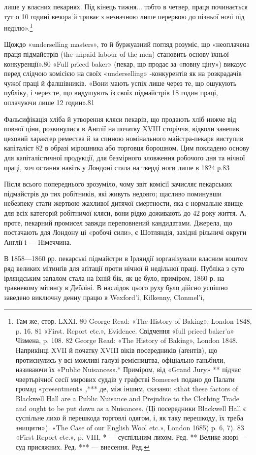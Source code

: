 \parcont{}  %
лише у власних пекарнях. Під кінець тижня... тобто в четвер,
праця починається тут о 10 годині вечора й триває з незначною
лише перервою до пізньої ночі під неділю».\footnote{
Там же, стор. LXXI.
80 George Read: «The History of Baking», London 1848, p. 16.
81 «First. Report etc.», Evidence. Свідчення «full priced baker’a» Чізмена,
p. 108.
82 George Read: «The History of Baking», London 1848. Наприкінці
XVII й початку XVIII віків посередників (аґентів), що протиснулись
у всі можливі галузі ремісництва, офіціально ганьбили, називаючи
їх «Public Nuisances».* Приміром, від «Grand Jury» ** підчас чвертьрічної
сесії мирових суддів у графстві Somerset подано до Палати громад «presentment»
,*** де, між іншим, сказано: «that these factors of Blackwell Hall
are a Public Nuisance and Prejudice to the Clothing Trade and ought to be
put down as a Nuisance». (Ці посередники Blackwell Hall є суспільне лихо
й перешкода торговлі одягом, і, як таку перешкоду, їх треба знищити»).
«The Case of our English Wool etc.», London 1685) p. 6, 7).
83 «First Report etc.», p. VIII.
* — суспільним лихом. Ред.
** Велике жюрі — суд присяжних. Ред.
*** — внесення. Ред.
}

Щождо «underselling masters», то й буржуазний погляд розуміє,
що «неоплачена праця підмайстрів (the unpaid labour of
the men) становить основу їхньої конкуренції».80 «Full priced
baker» (пекар, що продає за «повну ціну») виказує перед слідчою
комісією на своїх «underselling» -конкурентів як на розкрадачів
чужої праці й фалшівників. «Вони мають успіх лише
через те, що ошукують публіку, і через те, що видушують із
своїх підмайстрів 18 годин праці, оплачуючи лише 12 годин».81

Фальсифікація хліба й утворення кляси пекарів, що продають
хліб нижче від повної ціни, розвинулися в Англії на початку
XVIII сторіччя, відколи занепав цеховий характер ремества й
за спиною номінального майстра-пекаря виступив капіталіст 82
в образі мірошника або торговця борошном. Цим покладено основу
для капіталістичної продукції, для безмірного зловження робочого
дня та нічної праці, хоч остання навіть у Лондоні стала на тверді
ноги лише в 1824 р.83

Після всього попереднього зрозуміло, чому звіт комісії зачисляє
пекарських підмайстрів до тих робітників, які живуть
недовго; щасливо поминувши небезпеку стати жертвою жахливої
дитячої смертности, яка є нормальне явище для всіх категорій
робітничої кляси, вони рідко доживають до 42 року життя. А, проте,
пекарний промисел завжди переповнений кандидатами. Джерела,
що постачають для Лондону ці «робочі сили», є Шотляндія, західні
рільничі округи Англії і — Німеччина.

В 1858—1860 рр. пекарські підмайстри в Ірляндії зорганізували
власним коштом ряд великих мітинґів для аґітації проти
нічної й недільної праці. Публіка з суто ірляндським запалом
стала на їхній бік, як це було, приміром, 1860 р. на травневому
мітинґу в Дебліні. В наслідок цього руху було дійсно успішно
заведено виключну денну працю в Wexford’і, Kilkenny, Clonmel’i,
\parbreak{}  %

